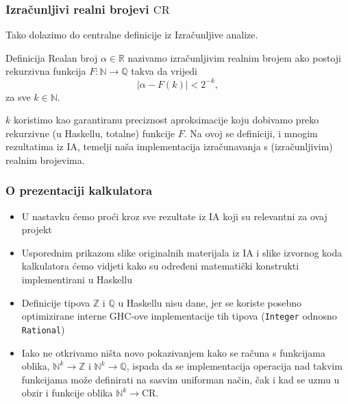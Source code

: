 \documentclass{beamer}
\def\N{\mathbb{N}}
\def\Z{\mathbb{Z}}
\def\Q{\mathbb{Q}}
\def\R{\mathbb{R}}
\def\CR{\mathrm{CR}}
\begin{document}
\begin{frame}
    \frametitle{Izračunljivi realni brojevi $\CR$}
    Tako dolazimo do centralne definicije iz Izračunljive analize.
    \begin{block}{Definicija}
    Realan broj $\alpha\in\R$ nazivamo izračunljivim realnim brojem
    ako postoji rekurzivna funkcija $F:\N\to\Q$ takva da vrijedi
    \begin{equation*}
        |\alpha-F(k)| < 2^{-k},
    \end{equation*}
    za sve $k\in\N$.
    \end{block}
    $k$ koristimo kao garantiranu preciznost aproksimacije koju dobivamo
    preko rekurzivne (u Haskellu, totalne) funkcije $F$. Na ovoj se
    definiciji, i mnogim rezultatima iz IA, temelji naša implementacija
    izračunavanja s (izračunljivim) realnim brojevima.
\end{frame}

\begin{frame}
    \frametitle{O prezentaciji kalkulatora}
    \begin{itemize}
        \item U nastavku ćemo proći kroz sve rezultate iz IA
        koji su relevantni
        za ovaj projekt
        \item Usporednim prikazom slike originalnih
        materijala iz IA i slike izvornog koda kalkulatora ćemo vidjeti
        kako su određeni matematički konstrukti implementirani u Haskellu
        \item Definicije tipova $\Z$ i $\Q$ u Haskellu nisu dane, jer se
        koriste posebno optimizirane interne GHC-ove implementacije tih tipova
        (\texttt{Integer} odnosno \texttt{Rational})
        \item Iako ne otkrivamo ništa novo pokazivanjem kako se računa
        s funkcijama oblika, $\N^k\to\Z$ i $\N^k\to\Q$, ispada da
        se implementacija operacija nad takvim funkcijama može definirati
        na sasvim uniforman način, čak i kad se uzmu u obzir i funkcije
        oblika $\N^k\to\CR$.    
    \end{itemize}
\end{frame}
\end{document}
